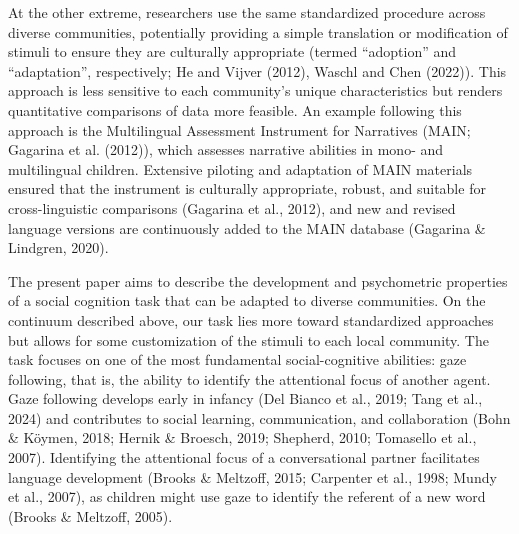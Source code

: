 \documentclass[
  man,floatsintext]{apa7}
\begin{document}
At the other extreme, researchers use the same standardized procedure across diverse communities, potentially providing a simple translation or modification of stimuli to ensure they are culturally appropriate (termed ``adoption'' and ``adaptation'', respectively; He and Vijver (2012), Waschl and Chen (2022)).
This approach is less sensitive to each community's unique characteristics but renders quantitative comparisons of data more feasible.
An example following this approach is the Multilingual Assessment Instrument for Narratives (MAIN; Gagarina et al. (2012)), which assesses narrative abilities in mono- and multilingual children.
Extensive piloting and adaptation of MAIN materials ensured that the instrument is culturally appropriate, robust, and suitable for cross-linguistic comparisons (Gagarina et al., 2012), and new and revised language versions are continuously added to the MAIN database (Gagarina \& Lindgren, 2020).

The present paper aims to describe the development and psychometric properties of a social cognition task that can be adapted to diverse communities.
On the continuum described above, our task lies more toward standardized approaches but allows for some customization of the stimuli to each local community.
The task focuses on one of the most fundamental social-cognitive abilities: gaze following, that is, the ability to identify the attentional focus of another agent.
Gaze following develops early in infancy (Del Bianco et al., 2019; Tang et al., 2024) and contributes to social learning, communication, and collaboration (Bohn \& Köymen, 2018; Hernik \& Broesch, 2019; Shepherd, 2010; Tomasello et al., 2007).
Identifying the attentional focus of a conversational partner facilitates language development (Brooks \& Meltzoff, 2015; Carpenter et al., 1998; Mundy et al., 2007), as children might use gaze to identify the referent of a new word (Brooks \& Meltzoff, 2005).
\end{document}
